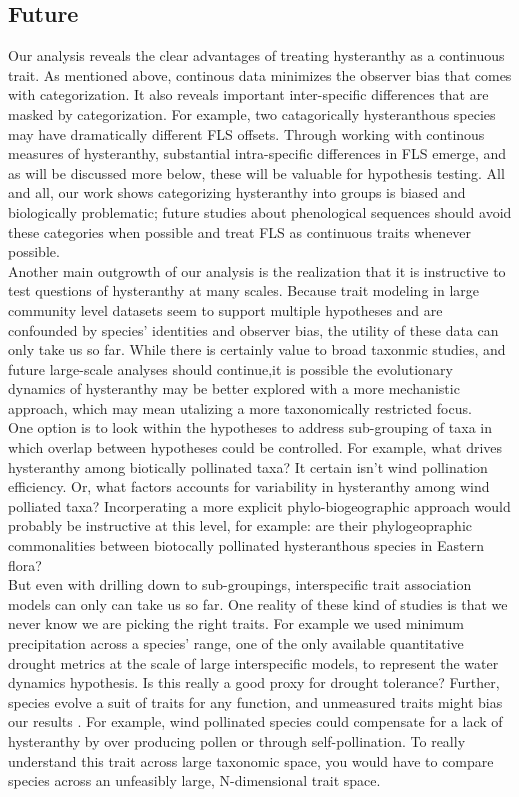 \documentclass[12pt]{article}\usepackage[]{graphicx}\usepackage[]{color}
\begin{document}
{\subsection*{Future}
\indent\indent Our analysis reveals the clear advantages of treating hysteranthy as a continuous trait. As mentioned above, continous data minimizes the observer bias that comes with categorization. It also reveals important inter-specific differences that are masked by categorization. For example, two catagorically hysteranthous species may have dramatically different FLS offsets. Through working with continous measures of hysteranthy, substantial intra-specific differences in FLS emerge, and as will be discussed more below, these will be valuable for hypothesis testing. All and all, our work shows categorizing hysteranthy into groups is biased and biologically problematic; future studies about phenological sequences should avoid these categories when possible and treat FLS as continuous traits whenever possible.\\
 \indent Another main outgrowth of our analysis is the realization that it is instructive to test questions of hysteranthy at many scales. Because trait modeling in large community level datasets seem to support multiple hypotheses and are confounded by species' identities and observer bias, the utility of these data can only take us so far. While there is certainly value to broad taxonmic studies, and future large-scale analyses should continue,it is possible the evolutionary dynamics of hysteranthy may be better explored with a more mechanistic approach, which may mean utalizing a more taxonomically restricted focus.\\
\indent One option is to look within the hypotheses to address sub-grouping of taxa in which overlap between hypotheses could be controlled. For example, what drives hysteranthy among biotically pollinated taxa? It certain isn't wind pollination efficiency. Or, what factors accounts for variability in hysteranthy among wind polliated taxa? Incorperating a more explicit phylo-biogeographic approach would probably be instructive at this level, for example: are their phylogeopraphic commonalities between biotocally pollinated hysteranthous species in Eastern flora?\\
\indent But even with drilling down to sub-groupings, interspecific trait association models can only can take us so far. One reality of these kind of studies is that we never know we are picking the right traits. For example we used minimum precipitation across a species' range, one of the only available quantitative drought metrics at the scale of large interspecific models, to represent the water dynamics hypothesis. Is this really a good proxy for drought tolerance? Further, species evolve a suit of traits for any function, and unmeasured traits might bias our results \citep{Davies2019}. For example, wind pollinated species could compensate for a lack of hysteranthy by over producing pollen or through self-pollination. To really understand this trait across large taxonomic space, you would have to compare species across an unfeasibly large, N-dimensional trait space.\\
}
\end{document}
